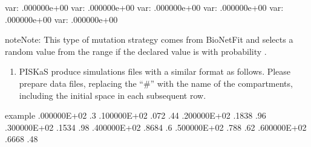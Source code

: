 \documentclass[letterpaper,10pt,english]{sphinxmanual}
\begin{document}
%
\begin{sphinxVerbatim}[commandchars=\\\{\}]
\PYGZpc{}var:  .000000e+00 
\PYGZpc{}var:  .000000e+00 
\PYGZpc{}var:  .000000e+00 
\PYGZpc{}var:  .000000e+00 
\PYGZpc{}var:  .000000e+00 
\PYGZpc{}var:  .000000e+00 
\end{sphinxVerbatim}

\begin{sphinxadmonition}{note}{Note:}
 This type of mutation strategy comes from BioNetFit and
selects a random value from the range 
if the declared value is  with probability .
\end{sphinxadmonition}
\begin{enumerate}
\def\theenumi{\arabic{enumi}}
\def\labelenumi{\theenumi .}
\makeatletter\def\p@enumii{\p@enumi \theenumi .}\makeatother
\setcounter{enumi}{1}
\item {} 

PISKaS produce simulations files with a similar format as follows. Please prepare
data files, replacing the “\#” with the name of the compartments, including the initial
space in each subsequent row.

\end{enumerate}

%
\begin{sphinxVerbatim}[commandchars=\\\{\}]
example   
 .000000E+02  .3
 .100000E+02 .072 .44
 .200000E+02 .1838 .96
 .300000E+02 .1534 .98
 .400000E+02 .8684 .6
 .500000E+02 .788 .62
 .600000E+02 .6668 .48
\end{sphinxVerbatim}
\end{document}
